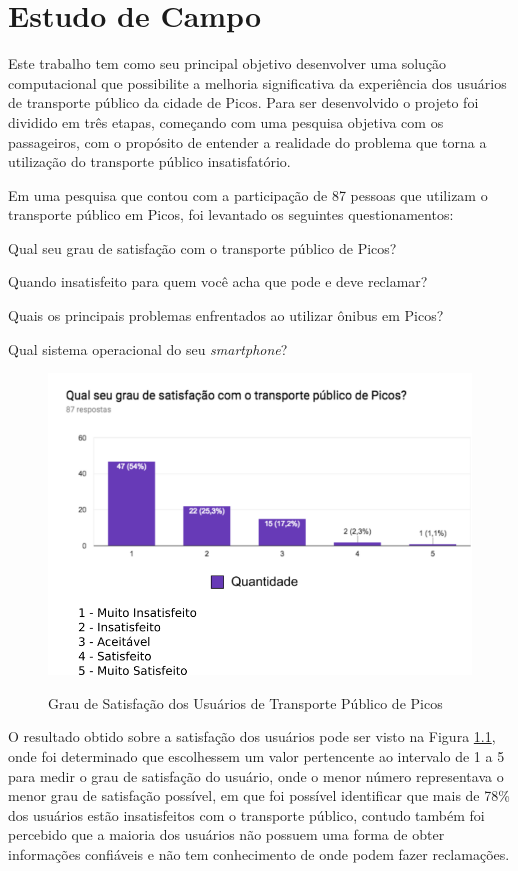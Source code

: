 \chapter{Estudo de Campo}\label{cap:estudo-de-campo}

Este trabalho tem como seu principal objetivo desenvolver uma solução computacional que possibilite a melhoria
significativa da experiência dos usuários de transporte público da cidade de Picos. Para ser desenvolvido o projeto
foi dividido em três etapas, começando com uma pesquisa objetiva com os passageiros, com o propósito de entender
a realidade do problema que torna a utilização do transporte público insatisfatório.

Em uma pesquisa que contou com a participação de 87 pessoas que utilizam o transporte público em Picos, foi levantado os seguintes questionamentos:

\begin{lista}
\item Qual seu grau de satisfação com o transporte público de Picos?
\item Quando insatisfeito para quem você acha que pode e deve reclamar?
\item Quais os principais problemas enfrentados ao utilizar ônibus em Picos?
\item Qual sistema operacional do seu \textit{smartphone}?
\end{lista}

\begin{figure}[H]
\caption{Grau de Satisfação dos Usuários de Transporte Público de Picos}
\centering
\includegraphics[width=.8\textwidth]{imagens/satisfacao.png}
\label{fig:satisfacao}
\end{figure}

O resultado obtido sobre a satisfação dos usuários pode ser visto na Figura \ref{fig:satisfacao}, onde foi determinado que escolhessem um valor pertencente ao intervalo de 1 a 5 para medir o grau de satisfação do usuário, onde o menor número representava o menor grau de satisfação possível, em que foi possível identificar que mais de 78\% dos usuários estão insatisfeitos com o transporte público, contudo também foi percebido que a maioria dos usuários não possuem uma forma de obter informações confiáveis e não tem conhecimento de onde podem fazer reclamações.


